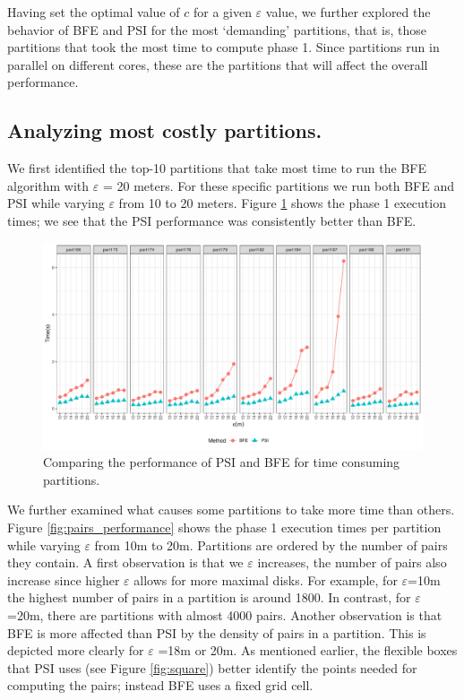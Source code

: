 Having set the optimal value of $c$ for a given $\varepsilon$ value, we further explored the behavior of BFE and PSI for the most `demanding' partitions, that is, those partitions that took the most time to compute phase 1. Since partitions run in parallel on different cores, these are the partitions that will affect the overall performance.  

\subsection{Analyzing most costly partitions.}
We first identified the top-10 partitions that take most time to run the BFE algorithm with $\varepsilon$ = 20 meters. For these specific partitions we run both BFE and PSI while varying $\varepsilon$ from 10 to 20 meters. Figure \ref{fig:top_time_partitions} 
shows the phase 1 execution times; we see that the PSI performance was consistently better than BFE. 

\begin{figure}
    \centering
    \includegraphics[width=\linewidth]{figures/plots/03_top_time_partitions/top_time_partitions.pdf}
    \caption{Comparing the performance of PSI and BFE for time consuming  partitions.}\label{fig:top_time_partitions}
\end{figure}

We further examined what causes some partitions to take more time than others. Figure \ref{fig:pairs_performance} shows the phase 1 execution times per partition while varying $\varepsilon$ from 10m to 20m. Partitions are ordered by the number of pairs they contain. A first observation is that we $\varepsilon$  increases, the number of pairs also increase since higher $\varepsilon$  allows for more maximal disks. For example, for $\varepsilon$=10m the highest number of pairs in a partition is around 1800. In contrast, for $\varepsilon$ =20m, there are partitions with almost 4000 pairs. Another observation is that BFE is more affected than PSI by the density of pairs in a partition. This is depicted more clearly for $\varepsilon$ =18m or 20m. As mentioned earlier, the flexible boxes that PSI uses (see Figure \ref{fig:square}) better identify the points needed for computing the pairs; instead BFE uses a fixed grid cell. 

